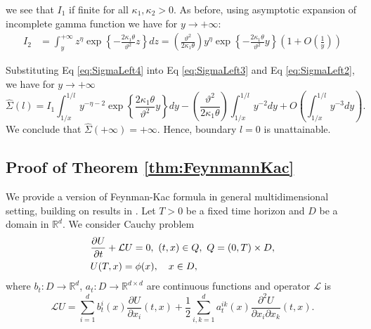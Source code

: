 \documentclass[11pt,a4paper] {article}
\begin{document}
we see that $I_1$ if finite for all $\kappa_1, \kappa_2>0$. 
As before, using asymptotic expansion of incomplete gamma function we have for $y\to +\infty$:
\begin{equation}\label{eq:SigmaLeft4}
\begin{split}
I_2&=\int_y^{+\infty}z^{\eta}\exp\left\{-\frac{2\kappa_1\theta}{\vartheta^2}z\right\}dz
=\left(\frac{\vartheta^2}{2\kappa_1\theta}\right)y^{\eta}\exp\left\{-\frac{2\kappa_1\theta}{\vartheta^2}y\right\}\left(1+O\left(\frac{1}{y}\right)\right)
\end{split}
\end{equation}

Substituting Eq \eqref{eq:SigmaLeft4} into Eq \eqref{eq:SigmaLeft3} and Eq \eqref{eq:SigmaLeft2}, we have for $y\to +\infty$
\begin{equation*}
\widehat\Sigma(l)=I_1
\int_{1/x}^{1/l}y^{-\eta-2}\exp\left\{\frac{2\kappa_1\theta}{\vartheta^2}y\right\}dy-
\left(\frac{\vartheta^2}{2\kappa_1\theta}\right)\int_{1/x}^{1/l}y^{-2}dy+O\left(\int_{1/x}^{1/l}y^{-3}dy\right).
\end{equation*}
We conclude that $\widehat\Sigma(+\infty)=+\infty$. Hence, boundary $l=0$ is unattainable. 



\subsection{Proof of Theorem \ref{thm:FeynmannKac}}\label{app:FeynmanKac}

We provide a version of Feynman-Kac formula in general multidimensional setting, building on results in \cite{Heath2000}. Let $T>0$ be a fixed time horizon and $D$ be a domain in $\mathbb{R}^d$. We consider Cauchy problem
\begin{equation}\label{app:Cauchy_prob}
\begin{split}
& \frac{\partial U}{\partial t}+\mathcal{L}U=0, \ (t,x)\in Q, \  Q=(0,T)\times D,\\
& U(T,x)=\phi(x), \quad x\in D,\vspace*{-1.0\baselineskip}
\end{split}
\end{equation}
where $b_t: D\to \mathbb{R}^d$,  $a_t: D\to \mathbb{R}^{d\times d}$ are continuous functions and operator $\mathcal{L}$ is
\begin{equation}\label{eq:fc_generator}
\mathcal{L}U=\sum_{i=1}^d b_t^i(x)\frac{\partial U}{\partial x_i}(t,x) + \frac{1}{2}\sum_{i,k=1}^d a_t^{ik}(x)\frac{\partial^2 U}{\partial x_i\partial x_k}(t,x).
\end{equation}
\end{document}
